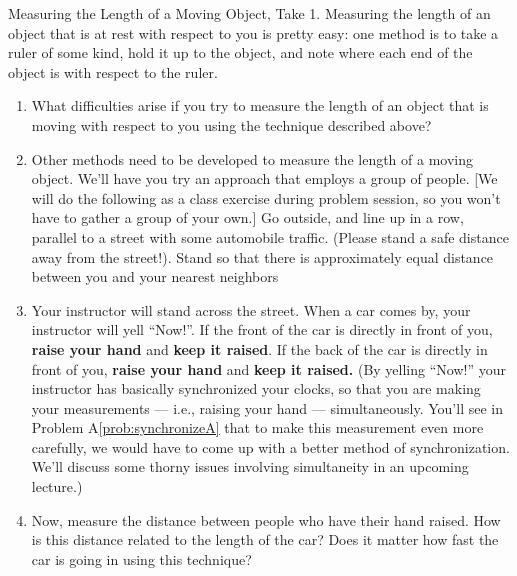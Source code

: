 \begin{aproblem}{Measuring the Length of a Moving Object, Take 1.}
  Measuring the length of an object that is at rest with respect to
  you is pretty easy: one method is to take a ruler of some kind, hold
  it up to the object, and note where each end of the object is with
  respect to the ruler.
  \begin{enumerate}
  \item What difficulties arise if you try to measure the length of an
    object that is moving with respect to you using the technique
    described above? 

  \item Other methods need to be developed to measure the length of a
    moving object.  We'll have you try an approach that employs a
    group of people.  [We will do the following as a class exercise
    during problem session, so you won't have to gather a group of
    your own.]  Go outside, and line up in a row, parallel to a street
    with some automobile traffic.  (Please stand a safe distance away
    from the street!).  Stand so that there is approximately equal
    distance between you and your nearest neighbors \medskip

  \item Your instructor will stand across the street.  When a car
    comes by, your instructor will yell ``Now!''.  If the front of the
    car is directly in front of you, {\bf raise your hand} and {\bf
      keep it raised}.  If the back of the car is directly in front of
    you, {\bf raise your hand} and {\bf keep it raised.}  (By yelling
    ``Now!'' your instructor has basically synchronized your clocks,
    so that you are making your measurements --- i.e., raising your
    hand --- simultaneously.  You'll see in Problem
    A\ref{prob:synchronizeA} that to make this measurement even more
    carefully, we would have to come up with a better method of
    synchronization.  We'll discuss some thorny issues involving
    simultaneity in an upcoming lecture.)  \medskip

  \item Now, measure the distance between people who have their hand
    raised.  How is this distance related to the length of the car?
    Does it matter how fast the car is going in using this technique?
  \end{enumerate}
  \label{prob:moving_objI}
\end{aproblem}

